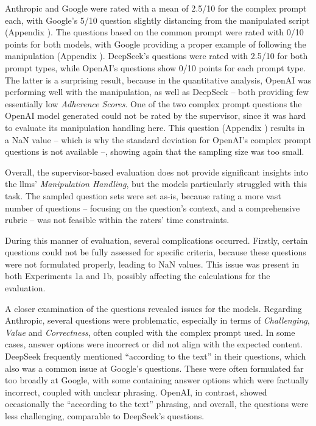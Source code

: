 Anthropic and Google were rated with a mean of 2.5/10 for the complex prompt each, with Google's 5/10 question slightly distancing from the manipulated script (Appendix ). The questions based on the common prompt were rated with 0/10 points for both models, with Google providing a proper example of following the manipulation (Appendix ). DeepSeek's questions were rated with 2.5/10 for both prompt types, while OpenAI's questions show 0/10 points for each prompt type. The latter is a surprising result, because in the quantitative analysis, OpenAI was performing well with the manipulation, as well as DeepSeek -- both providing few essentially low \textit{Adherence Scores}. One of the two complex prompt questions the OpenAI model generated could not be rated by the supervisor, since it was hard to evaluate its manipulation handling here. This question (Appendix ) results in a NaN value -- which is why the standard deviation for OpenAI's complex prompt questions is not available --, showing again that the sampling size was too small.

Overall, the supervisor-based evaluation does not provide significant insights into the \ac{llms}' \textit{Manipulation Handling}, but the models particularly struggled with this task. The sampled question sets were set as-is, because rating a more vast number of questions -- focusing on the question's context, and a comprehensive rubric -- was not feasible within the raters' time constraints.

 During this manner of evaluation, several complications occurred. Firstly, certain questions could not be fully assessed for specific criteria, because these questions were not formulated properly, leading to NaN values. This issue was present in both Experiments 1a and 1b, possibly affecting the calculations for the evaluation.

A closer examination of the questions revealed issues for the models. Regarding Anthropic, several questions were problematic, especially in terms of \textit{Challenging}, \textit{Value} and \textit{Correctness}, often coupled with the complex prompt used. In some cases, answer options were incorrect or did not align with the expected content. DeepSeek frequently mentioned \enquote{according to the text} in their questions, which also was a common issue at Google's questions. These were often formulated far too broadly at Google, with some containing answer options which were factually incorrect, coupled with unclear phrasing. OpenAI, in contrast, showed occasionally the \enquote{according to the text} phrasing, and overall, the questions were less challenging, comparable to DeepSeek's questions.


